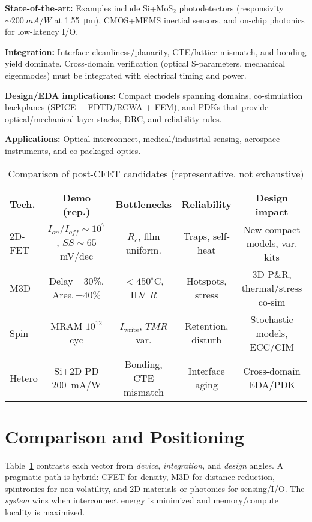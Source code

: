 \documentclass[conference]{IEEEtran}
\begin{document}
\textbf{State-of-the-art:}
Examples include Si+MoS$_2$ photodetectors (responsivity $\sim\SI{200}{mA/W}$ at \SI{1.55}{\micro m}), CMOS+MEMS inertial sensors, and on-chip photonics for low-latency I/O.

\textbf{Integration:}
Interface cleanliness/planarity, CTE/lattice mismatch, and bonding yield dominate.
Cross-domain verification (optical S-parameters, mechanical eigenmodes) must be integrated with electrical timing and power.

\textbf{Design/EDA implications:}
Compact models spanning domains, co-simulation backplanes (SPICE + FDTD/RCWA + FEM), and PDKs that provide optical/mechanical layer stacks, DRC, and reliability rules.

\textbf{Applications:}
Optical interconnect, medical/industrial sensing, aerospace instruments, and co-packaged optics.

\begin{table}[!t]
\centering
\caption{Comparison of post-CFET candidates (representative, not exhaustive)}
\label{tab:comparison}
\begin{tabular}{@{}lcccc@{}}
\toprule
Tech. & Demo (rep.) & Bottlenecks & Reliability & Design impact \\
\midrule
2D-FET & $I_{on}/I_{off}\!\sim\!10^7$, $SS\!\sim\!65$ mV/dec &
$R_c$, film uniform. & Traps, self-heat &
New compact models, var. kits \\
M3D & Delay $-30$\%, Area $-40$\% &
$<\!450^\circ$C, ILV $R$ & Hotspots, stress &
3D P\&R, thermal/stress co-sim \\
Spin & MRAM $10^{12}$ cyc &
$I_\mathrm{write}$, $TMR$ var. & Retention, disturb &
Stochastic models, ECC/CIM \\
Hetero & Si+2D PD \SI{200}{mA/W} &
Bonding, CTE mismatch & Interface aging &
Cross-domain EDA/PDK \\
\bottomrule
\end{tabular}
\end{table}

\section{Comparison and Positioning}
Table~\ref{tab:comparison} contrasts each vector from \emph{device}, \emph{integration}, and \emph{design} angles.
A pragmatic path is hybrid: CFET for density, M3D for distance reduction, spintronics for non-volatility, and 2D materials or photonics for sensing/I/O.
The \emph{system} wins when interconnect energy is minimized and memory/compute locality is maximized.
\end{document}
